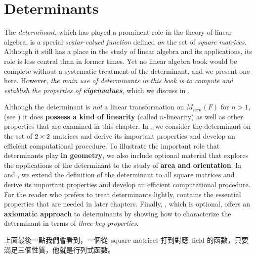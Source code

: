 \chapter{Determinants} \label{ch 4}

The \emph{determinant}, which has played a prominent role in the theory of linear algebra, is a special \emph{scalar-valued function} defined \emph{on} the set of \emph{square matrices}.
Although it still has a place in the study of linear algebra and its applications, its role is less central than in former times.
Yet no linear algebra book would be complete without a systematic treatment of the determinant, and we present one here.
However, \emph{the main use of determinants in this book is to compute and establish the properties of \textbf{eigenvalues}}, which we discuss in .

Although the determinant is \emph{not} a linear transformation on \(M_{n x n}(F)\) for \(n > 1\),
(see )
it does \textbf{possess a kind of linearity} (called \(n\)-linearity) as well as other properties that are examined in this chapter.
In , we consider the determinant on the set of \(2 \times 2\) matrices and derive its important properties and develop an efficient computational procedure.
To illustrate the important role that determinants play \textbf{in geometry}, we also include optional material that explores the applications of the determinant to the study of \textbf{area and orientation}.
In  and , we extend the definition of the determinant to all square matrices and derive its important properties and develop an efficient computational procedure.
For the reader who prefers to treat determinants lightly,  contains the essential properties that are needed in later chapters.
Finally, , which is optional, offers an \textbf{axiomatic approach} to determinants by showing how to characterize the determinant in terms of \emph{three key properties}.

\begin{note}
上面最後一點我們會看到，一個從\ square matrices 打到對應\ field 的函數，只要滿足三個性質，他就是行列式函數。
\end{note}







